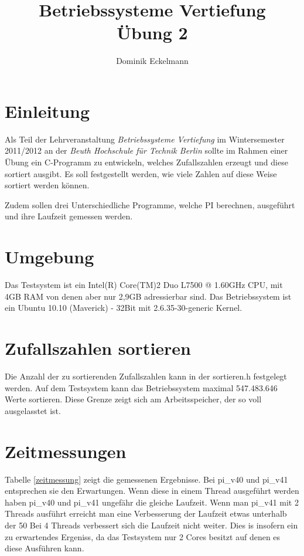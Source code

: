 \documentclass[12pt,a4paper]{article}
\author{Dominik Eckelmann}
\title{Betriebssysteme Vertiefung\\Übung 2}
\date{}
\begin{document}
\maketitle

\section{Einleitung}
Als Teil der Lehrveranstaltung \textit{Betriebssysteme Vertiefung} im Wintersemester 2011/2012 an der \textit{Beuth Hochschule für Technik Berlin} sollte im Rahmen einer Übung ein C-Programm zu
entwickeln, welches Zufallszahlen erzeugt und diese sortiert ausgibt. Es soll festgestellt
werden, wie viele Zahlen auf diese Weise sortiert werden können.

Zudem sollen drei Unterschiedliche Programme, welche PI berechnen, ausgeführt und ihre Laufzeit
gemessen werden.

\section{Umgebung}
Das Testsystem ist ein Intel(R) Core(TM)2 Duo L7500 @ 1.60GHz CPU, mit 4GB RAM von denen aber nur 2,9GB adressierbar sind.
Das Betriebssystem ist ein Ubuntu 10.10 (Maverick) - 32Bit mit 2.6.35-30-generic Kernel.

\section{Zufallszahlen sortieren}
Die Anzahl der zu sortierenden Zufallszahlen kann in der sortieren.h festgelegt werden.
Auf dem Testsystem kann das Betriebssystem maximal 547.483.646 Werte sortieren.
Diese Grenze zeigt sich am Arbeitsspeicher, der so voll ausgelasstet ist.

\section{Zeitmessungen}

Tabelle \ref{zeitmessung} zeigt die gemessenen Ergebnisse.
Bei pi\_v40 und pi\_v41 entsprechen sie den Erwartungen.
Wenn diese in einem Thread ausgeführt werden haben pi\_v40 und pi\_v41
ungefähr die gleiche Laufzeit. Wenn man pi\_v41 mit 2 Threads ausführt
erreicht man eine Verbesserung der Laufzeit etwas unterhalb der 50%
Bei 4 Threads verbessert sich die Laufzeit nicht weiter. Dies is insofern
ein zu erwartendes Ergeniss, da das Testsystem nur 2 Cores besitzt auf denen
es diese Ausführen kann.
\end{document}

